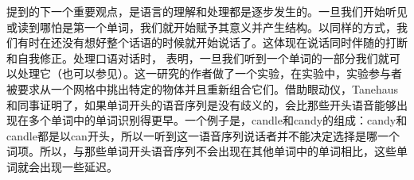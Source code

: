  \citet{SW2011a} 提到的下一个重要观点，是语言的理解和处理都是逐步发生的。一旦我们开始听见或读到哪怕是第一个单词，我们就开始赋予其意义并产生结构。以同样的方式，我们有时在还没有想好整个话语的时候就开始说话了。这体现在说话同时伴随的打断和自我修正\citep{CW98a,CFT2002a}。处理口语对话时， \citet{TSKES96a}表明，一旦我们听到一个单词的一部分我们就可以处理它（也可以参见\citealp{Marslen-Wilson75a}）。这一研究的作者做了一个实验，在实验中，实验参与者被要求从一个网格中挑出特定的物体并且重新组合它们。借助眼动仪，Tanehaus和同事证明了，如果单词开头的语音序列是没有歧义的，会比那些开头语音能够出现在多个单词中的单词识别得更早。一个例子是，candle和candy的组成：candy和candle都是以can开头，所以一听到这一语音序列说话者并不能决定选择是哪一个词项。所以，与那些单词开头语音序列不会出现在其他单词中的单词相比，这些单词就会出现一些延迟。\citep[]{TSKES95a}

